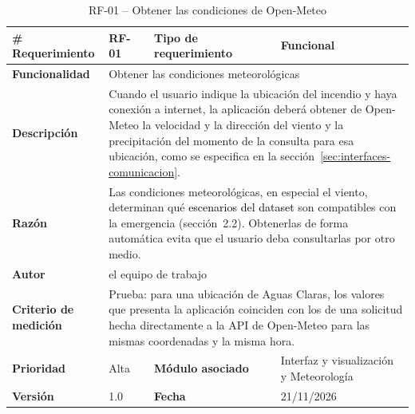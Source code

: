 \begin{longtable}{|p{\rqA}|p{\rqB}|p{\rqC}|p{\rqD}|}
  \caption{RF-01 -- Obtener las condiciones de Open-Meteo}\label{tab:rf-01}\tabularnewline
  \hline
  \textbf{\# Requerimiento} & RF-01 & \raggedright\textbf{Tipo de requerimiento} & Funcional\tabularnewline\hline
  \raggedright\textbf{Funcionalidad} & \multicolumn{3}{p{\rqBCD}|}{Obtener las condiciones meteorológicas}\tabularnewline\hline
  \endfirsthead
  \textbf{Descripción} & \multicolumn{3}{p{\rqBCD}|}{Cuando el usuario indique la ubicación del incendio y haya conexión a internet, la aplicación deberá obtener de Open-Meteo la velocidad y la dirección del viento y la precipitación del momento de la consulta para esa ubicación, como se especifica en la sección~\textcolor{black}{\ref{sec:interfaces-comunicacion}}.}\tabularnewline\hline
  \textbf{Razón} & \multicolumn{3}{p{\rqBCD}|}{Las condiciones meteorológicas, en especial el viento, determinan qué \textcolor{black}{escenarios del dataset} son compatibles con la emergencia (sección~2.2). Obtenerlas de forma automática evita que el usuario deba consultarlas por otro medio.}\tabularnewline\hline
  \textbf{Autor} & \multicolumn{3}{p{\rqBCD}|}{el equipo de trabajo}\tabularnewline\hline
  \raggedright\textbf{Criterio de medición} & \multicolumn{3}{p{\rqBCD}|}{Prueba: para una ubicación de Aguas Claras, los valores que presenta la aplicación coinciden con los de una solicitud hecha directamente a la API de Open-Meteo para las mismas coordenadas y la misma hora.}\tabularnewline\hline
  \textbf{Prioridad} & Alta & \raggedright\textbf{Módulo asociado} & Interfaz y visualización y Meteorología\tabularnewline\hline
  \textbf{Versión} & 1.0 & \textbf{Fecha} & 21/11/2026\tabularnewline\hline
\end{longtable}

